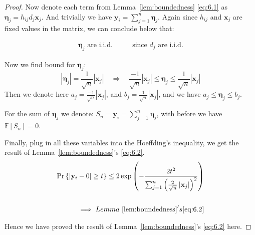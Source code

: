 \documentclass[11pt]{article}
\numberwithin{equation}{section}
\theoremstyle{plain}
\theoremstyle{definition}
\theoremstyle{remark}
\begin{document}
\begin{appendix}
\begin{proof}
Now denote each term from Lemma~\ref{lem:boundedness} \ref{eq:6.1} as $\mathbf{\eta}_{j} = h_{ij}d_j\mathbf{x}_j$. And trivially we have $\mathbf{y}_i = \sum_{j=1}^{n}\mathbf{\eta}_{j}$.
Again since $h_{ij}$ and $\mathbf{x}_j$ are fixed values in the matrix, we can conclude below that:

\[
\begin{aligned}
\mathbf{\eta}_{j} \text{ are i.i.d.} \qquad & \text{since } d_j \text{ are i.i.d.}
\end{aligned}
\]

Now we find bound for $\mathbf{\eta}_{j}$:
\[
\left|\mathbf{\eta}_{j}\right| = \frac{1}{\sqrt{n}} \left|\mathbf{x}_j\right|
\quad\Rightarrow\quad
\frac{-1}{\sqrt{n}}\left|\mathbf{x}_j\right|
\leq \mathbf{\eta}_{j}
\leq \frac{1}{\sqrt{n}}\left|\mathbf{x}_j\right|
\]
Then we denote here $a_j = \frac{-1}{\sqrt{n}}\left|\mathbf{x}_j\right|$, and $b_j = \frac{1}{\sqrt{n}}\left|\mathbf{x}_j\right|$, and we have $a_j \leq \mathbf{\eta}_{j} \leq b_j$.

For the sum of $\mathbf{\eta}_{j}$ we denote: $S_n = \mathbf{y}_i = \sum_{j=1}^{n} \mathbf{\eta}_{j}$, with before we have $\mathbb{E}[S_n] = 0$.

Finally, plug in all these variables into the Hoeffding's inequality, we get the result of Lemma~\ref{lem:boundedness}'s \ref{eq:6.2}.
\[
\begin{aligned}
  \Pr{\left\{\left|\mathbf{y}_i - 0\right| \ge t\right\}} \le 2\exp\left(-\frac{2t^2}{\sum_{j=1}^{n}\left(\frac{2}{\sqrt{n}}\left|\mathbf{x}_j\right|\right)^2}\right)
  \\\\
  \implies Lemma~\ref{lem:boundedness}'s \ref{eq:6.2}
\end{aligned}
\]

Hence we have proved the result of Lemma~\ref{lem:boundedness}'s \ref{eq:6.2} here.

\end{proof}



\end{appendix}
\end{document}
